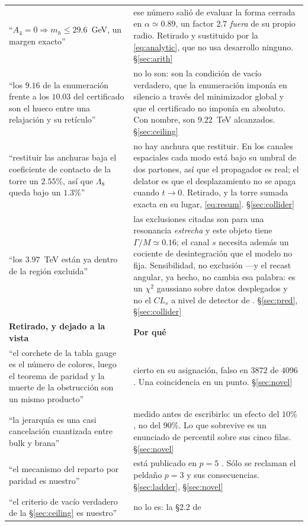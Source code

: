 \documentclass[11pt,a4paper]{article}
\begin{document}
\begin{longtable}{p{}p{}}
``$A_4=0\Rightarrow m_h\le29.6$~GeV, un margen exacto'' & ese número salió de evaluar la forma
cerrada en $\alpha\simeq0.89$, un factor $2.7$ \emph{fuera} de su propio radio. Retirado y
sustituido por la \eqref{eq:analytic}, que no usa desarrollo ninguno. \S\ref{sec:arith}\\
``los $9.16$ de la enumeración frente a los $10.03$ del certificado son el hueco entre una
relajación y su retículo'' & no lo son: son la condición de vacío verdadero, que la enumeración
imponía en silencio a través del minimizador global y que el certificado no imponía en absoluto.
Con nombre, son $9.22$~TeV alcanzados. \S\ref{sec:ceiling}\\
``restituir las anchuras baja el coeficiente de contacto de la torre un $2.55\%$, así que
$\Lambda_8$ queda bajo un $1.3\%$'' & no hay anchura que restituir. En los canales espaciales cada
modo está bajo su umbral de dos partones, así que el propagador es real; el delator es que el
desplazamiento no se apaga cuando $t\to0$. Retirado, y la torre sumada exacta en su lugar,
\eqref{eq:resum}. \S\ref{sec:collider}\\
``los $3.97$~TeV están ya dentro de la región excluida'' & las exclusiones citadas son para una
resonancia \emph{estrecha} y este objeto tiene $\Gamma/M\simeq0.16$; el canal $s$ necesita además
un cociente de desintegración que el modelo no fija. Sensibilidad, no exclusión ---y el recast
angular, ya hecho, no cambia esa palabra: es un $\chi^2$ gaussiano sobre datos desplegados y no el
$CL_s$ a nivel de detector de \cite{CMSangular}. \S\ref{sec:pred}, \S\ref{sec:collider}\\
\midrule
\rowcolor{warmred!14}\textbf{Retirado, y dejado a la vista} & \textbf{Por qué}\\
\midrule
``el corchete de la tabla gauge es el número de colores, luego el teorema de paridad y la muerte de
la obstrucción son un mismo producto'' & cierto en su asignación, falso en $3872$ de $4096$. Una
coincidencia en un punto. \S\ref{sec:novel}\\
``la jerarquía es una casi cancelación cuantizada entre bulk y brana'' & medido antes de escribirlo:
un efecto del $10\%$, no del $90\%$. Lo que sobrevive es un enunciado de percentil sobre sus cinco
filas. \S\ref{sec:novel}\\
``el mecanismo del reparto por paridad es nuestro'' & está publicado en $p=5$ \cite{CCD24}. Sólo se
reclaman el peldaño $p=3$ y sus consecuencias. \S\ref{sec:ladder}, \S\ref{sec:novel}\\
``el criterio de vacío verdadero de la \S\ref{sec:ceiling} es nuestro'' & no lo es: la \S2.2 de

\end{longtable}
\end{document}
